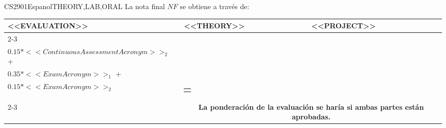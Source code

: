   \begin{evaluation}{CS2901}{Espanol}{THEORY,LAB,ORAL}
  La nota final $NF$ se obtiene a través de:
 
  \begin{tabularx}{0.9\textwidth}{|X|p{}|p{}|} \hline
  \multirow{4}{*}{\uppercase{<<Evaluation>>}} & \uppercase{<<Theory>>} & \uppercase{<<Project>>} \\ \cline{2-3}
  & %
      \begin{minipage}{0.95\textwidth}
      \begin{tabular}{l}
        $0.15*<<ContinuousAssessmentAcronym>>_{1}$ + \\
        $0.15*<<ContinuousAssessmentAcronym>>_{2}$ + \\
        $0.35*<<ExamAcronym>>_{1}$ + \\
        $0.15*<<ExamAcronym>>_{2}$
      \end{tabular} 
      \end{minipage} 
  & %
      \begin{minipage}{0.95\textwidth}
      \begin{tabular}{l}
          $0.2(A + D) + 0.3(Dev) + 0.3(DF)$
          \end{tabular} 
      \end{minipage}                 \\ \cline{2-3}
  
      & \multicolumn{2}{c|}{\textbf{La ponderación de la evaluación se haría si ambas partes están aprobadas.}}  \\ \hline
  \end{tabularx}
  

\end{evaluation}
